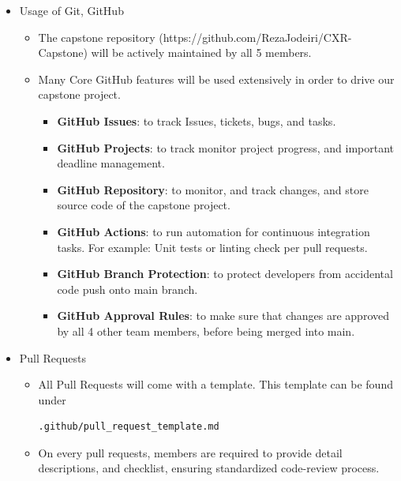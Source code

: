 \documentclass{article}
\begin{document}
\begin{itemize}

  \item Usage of Git, GitHub
  \begin{itemize}
    \item The capstone repository (https://github.com/RezaJodeiri/CXR-Capstone) will be actively maintained by all 5 members.
    \item Many Core GitHub features will be used extensively in order to drive our capstone project.
    \begin{itemize}
      \item \textbf{GitHub Issues}: to track Issues, tickets, bugs, and tasks.
      \item \textbf{GitHub Projects}: to track monitor project progress, and important deadline management.
      \item \textbf{GitHub Repository}: to monitor, and track changes, and store source code of the capstone project.
      \item \textbf{GitHub Actions}: to run automation for continuous integration tasks. For example: Unit tests or linting check per pull requests.
      \item \textbf{GitHub Branch Protection}: to protect developers from accidental code push onto main branch.
      \item \textbf{GitHub Approval Rules}: to make sure that changes are approved by all 4 other team members, before being merged into main.
    \end{itemize}
  \end{itemize}

  \item Pull Requests
  \begin{itemize}
    \item All Pull Requests will come with a template. This template can be found under \begin{verbatim}.github/pull_request_template.md \end{verbatim}
    \item On every pull requests, members are required to provide detail descriptions, and checklist, ensuring standardized code-review process.
  \end{itemize}
  

\end{itemize}
\end{document}
